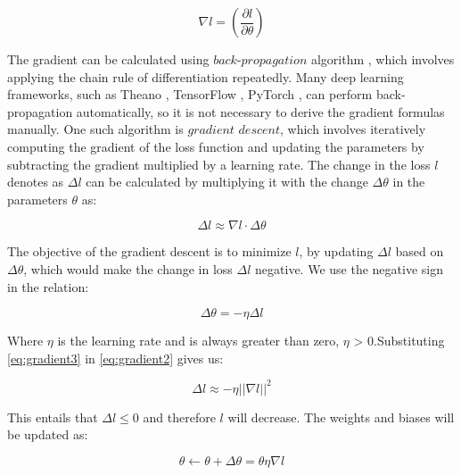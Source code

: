 \begin{equation}
    \label{eq:gradient}
    \nabla l = \left( \frac{\partial l}{\partial \theta} \right)
\end{equation}

The gradient can be calculated using $\textit{back-propagation}$ algorithm \cite{rumelhart1986learning}, which involves applying the chain rule of differentiation repeatedly. Many deep learning frameworks, such as Theano \cite{2016arXiv160502688short}, TensorFlow \cite{tensorflow2015-whitepaper}, PyTorch \cite{NEURIPS2019_9015}, can perform back-propagation automatically, so it is not necessary to derive the gradient formulas manually. One such algorithm is $\textit{gradient descent}$, which involves iteratively computing the gradient of the loss function and updating the parameters by subtracting the gradient multiplied by a learning rate.  The change in the loss $l$ denotes as $\Delta l$ can be calculated by multiplying it with the change  $\Delta \theta$ in the parameters $\theta$ as: 

\begin{equation}
    \label{eq:gradient2}
    \Delta l \approx \nabla l \cdot \Delta\theta
\end{equation}

The objective of the gradient descent is to minimize $l$, by updating $\Delta l$ based on $\Delta \theta$, which would make the change in loss $\Delta l$ negative. We use the negative sign in the relation:

\begin{equation}
    \label{eq:gradient3}
    \Delta \theta = - \eta \Delta l
\end{equation}

 Where $\eta$ is the learning rate and is always greater than zero, $\eta$ > 0.Substituting \ref{eq:gradient3} in \ref{eq:gradient2} gives us: 

 \begin{equation}
     \label{eq:gradient4} 
     \Delta l \approx - \eta \lvert  \lvert  \nabla  l \rvert \rvert ^2
 \end{equation}

 This entails that $\Delta l \leq 0$ and therefore $l$ will decrease. The weights and biases will be updated as: 

 \begin{equation}
     \label{gradient5}
     \theta \leftarrow \theta + \Delta \theta = \theta \eta \nabla l
 \end{equation}

